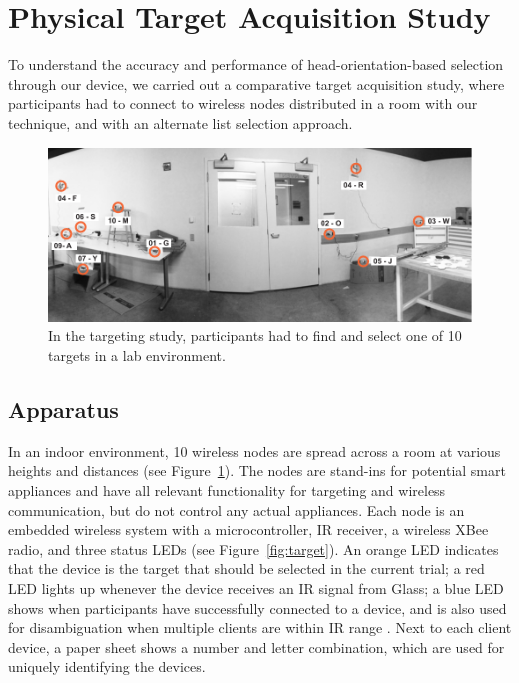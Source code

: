 \section{Physical Target Acquisition Study}
To understand the accuracy and performance of head-orientation-based  selection through our device, we carried out a comparative target acquisition study, where participants had to connect to wireless nodes distributed in a room with our technique, and with an alternate list selection approach.

\begin{figure}[t]
\centering
\includegraphics[width=1.0\columnwidth]{figures/targeting-study-layout.pdf}
\caption{In the targeting study, participants had to find and select one of 10 targets in a lab environment.}
\label{fig:targeting-study-layout}
\end{figure}

\subsection{Apparatus}
In an indoor environment, 10 wireless nodes are spread across a room at various heights and distances (see Figure~\ref{fig:targeting-study-layout}). The nodes are stand-ins for potential smart appliances and have all relevant functionality for targeting and wireless communication, but do not control any actual appliances. Each node is an embedded wireless system with a microcontroller, IR receiver, a wireless XBee radio, and three status LEDs (see Figure~\ref{fig:target}). An orange LED indicates that the device is the target that should be selected in the current trial; a red LED lights up whenever the device receives an IR signal from Glass; a blue LED shows when participants have successfully connected to a device, and is also used for disambiguation when multiple clients are within IR range . Next to each client device, a paper sheet shows a number and letter combination, which are used for uniquely identifying the devices.

